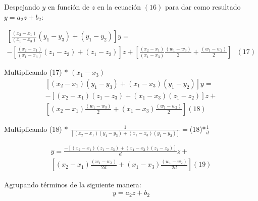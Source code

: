         Despejando $y$ en función de $z$ en la ecuación $(16)$ para dar como resultado $y= a_{2}z+ b_{2}$:

        \begin{multline*}
             \left[ \frac{ \left( x_{2}-x_{1} \right) }{ \left( x_{1}-x_{3} \right) } \left( y_{1}-y_{3} \right) +  \left( y_{1}-y_{2} \right)  \right] y=\\- \left[ \frac{ \left( x_{2}-x_{1} \right) }{ \left( x_{1}-x_{3} \right) } \left( z_{1}-z_{3} \right) + \left( z_{1}-z_{2} \right)  \right] z+  \left[ \frac{ \left( x_{2}-x_{1} \right) }{ \left( x_{1}-x_{3} \right) }\frac{ \left( w_{1} - w_{3} \right) }{2}+\frac{ \left( w_{1} - w_{2} \right) }{2} \right] ~~~ \left( 17 \right)
        \end{multline*}

\newpage


        Multiplicando (17) $\ast$ $\left( x_{1}-x_{3} \right)$
        \begin{multline*}
             \left[  \left( x_{2}-x_{1} \right)  \left( y_{1}-y_{3} \right) +  \left( x_{1}-x_{3} \right)  \left( y_{1}-y_{2} \right)  \right] y=\\- \left[  \left( x_{2}-x_{1} \right)  \left( z_{1}-z_{3} \right) + \left( x_{1}-x_{3} \right)  \left( z_{1}-z_{2} \right)  \right] z+\\ \left[  \left( x_{2}-x_{1} \right) \frac{ \left( w_{1} - w_{3} \right) }{2}+ \left( x_{1}-x_{3} \right) \frac{ \left( w_{1} - w_{2} \right) }{2} \right]  \left( 18 \right)
        \end{multline*}
        
        Multiplicando (18) $\ast$ $\frac{1}{ \left[  \left( x_{2}-x_{1} \right)  \left( y_{1}-y_{3} \right) +  \left( x_{1}-x_{3} \right)  \left( y_{1}-y_{2} \right)  \right] }= $(18)$\ast \frac{1}{d} $

        \begin{multline*}
             y=\frac{- \left[  \left( x_{2}-x_{1} \right)  \left( z_{1}-z_{3} \right) + \left( x_{1}-x_{3} \right)  \left( z_{1}-z_{2} \right)  \right] }{d}z+\\ \left[  \left( x_{2}-x_{1} \right) \frac{ \left( w_{1} - w_{3} \right) }{2d}+ \left( x_{1}-x_{3} \right) \frac{ \left( w_{1} - w_{2} \right) }{2d} \right]  \left( 19 \right)
        \end{multline*}

        Agrupando términos de la siguiente manera:
        \begin{equation*}
            y= a_{2}z+ b_{2}
        \end{equation*}

